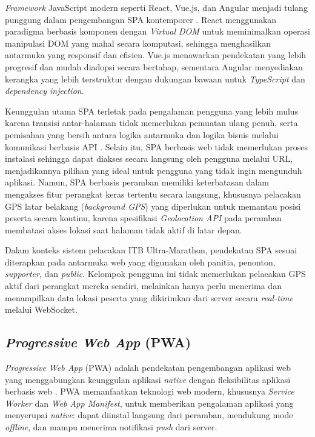 \textit{Framework} JavaScript modern seperti React, Vue.js, dan Angular menjadi tulang punggung dalam pengembangan SPA kontemporer \cite{osmani2023learning}. React menggunakan paradigma berbasis komponen dengan \textit{Virtual DOM} untuk meminimalkan operasi manipulasi DOM yang mahal secara komputasi, sehingga menghasilkan antarmuka yang responsif dan efisien. Vue.js menawarkan pendekatan yang lebih progresif dan mudah diadopsi secara bertahap, sementara Angular menyediakan kerangka yang lebih terstruktur dengan dukungan bawaan untuk \textit{TypeScript} dan \textit{dependency injection}.

Keunggulan utama SPA terletak pada pengalaman pengguna yang lebih mulus karena transisi antar-halaman tidak memerlukan pemuatan ulang penuh, serta pemisahan yang bersih antara logika antarmuka dan logika bisnis melalui komunikasi berbasis API \cite{richardson2008restful}. Selain itu, SPA berbasis web tidak memerlukan proses instalasi sehingga dapat diakses secara langsung oleh pengguna melalui URL, menjadikannya pilihan yang ideal untuk pengguna yang tidak ingin mengunduh aplikasi. Namun, SPA berbasis peramban memiliki keterbatasan dalam mengakses fitur perangkat keras tertentu secara langsung, khususnya pelacakan GPS latar belakang (\textit{background GPS}) yang diperlukan untuk memantau posisi peserta secara kontinu, karena spesifikasi \textit{Geolocation API} pada peramban membatasi akses lokasi saat halaman tidak aktif di latar depan.

Dalam konteks sistem pelacakan ITB Ultra-Marathon, pendekatan SPA sesuai diterapkan pada antarmuka web yang digunakan oleh panitia, penonton, \textit{supporter}, dan \textit{public}. Kelompok pengguna ini tidak memerlukan pelacakan GPS aktif dari perangkat mereka sendiri, melainkan hanya perlu menerima dan menampilkan data lokasi peserta yang dikirimkan dari server secara \textit{real-time} melalui WebSocket.

\subsection{\textit{Progressive Web App} (PWA)}
\textit{Progressive Web App} (PWA) adalah pendekatan pengembangan aplikasi web yang menggabungkan keunggulan aplikasi \textit{native} dengan fleksibilitas aplikasi berbasis web \cite{biorn2017progressive}. PWA memanfaatkan teknologi web modern, khususnya \textit{Service Worker} dan \textit{Web App Manifest}, untuk memberikan pengalaman aplikasi yang menyerupai \textit{native}: dapat diinstal langsung dari peramban, mendukung mode \textit{offline}, dan mampu menerima notifikasi \textit{push} dari server.

